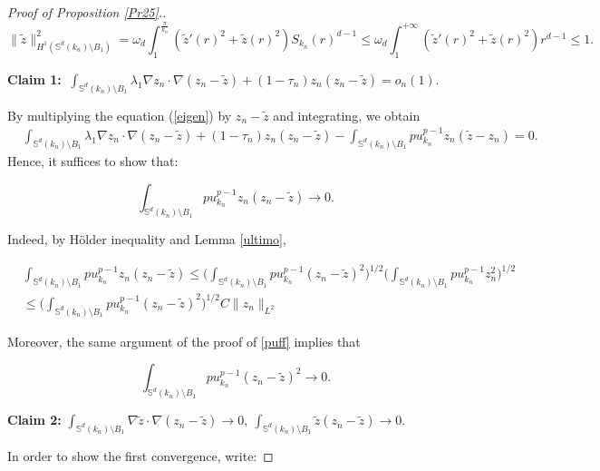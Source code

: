 \documentclass[reqno]{amsart}
\numberwithin{equation}{section}
\newenvironment{key words}{\textbf{Keywords}\mbox{  }}{ }
\begin{document}
\begin{proof}[Proof of Proposition \ref{Pr25}.]
$$\| \tilde{z}\|^2_{H^{1}(\mathbb{S}^{d}(k_{n})\setminus B_{1})} = \omega_d \int_1^{\frac{\pi}{k_n}} (\tilde{z}'(r)^2 + \tilde{z}(r)^2) S_{k_n}(r)^{d-1} \leq \omega_d \int_1^{+\infty} (\tilde{z}'(r)^2 + \tilde{z}(r)^2) r^{d-1} \leq 1.  $$

\medskip

{\bf Claim 1:}  $\ \displaystyle\int_{\mathbb{S}^{d}(k_{n})\setminus B_{1}} \lambda_{1} \nabla z_{n} \cdot \nabla (z_n - \tilde{z}) + (1-\tau_{n})z_{n}(z_n - \tilde{z}) = o_n(1).$

\medskip

By multiplying the equation (\ref{eigen}) by $z_{n}-\tilde{z}$ and integrating, we obtain
\begin{align}\label{eq040}
 &\int_{\mathbb{S}^{d}(k_{n})\setminus B_{1}} \lambda_{1} \nabla z_{n} \cdot \nabla (z_n - \tilde{z}) + (1-\tau_{n})z_{n}(z_n - \tilde{z}) -\int_{\mathbb{S}^{d}(k_{n})\setminus B_{1}} pu_{k_{n}}^{p-1} z_{n} (\tilde{z} - z_n)=0.
\end{align}
Hence, it suffices to show that:

$$ \displaystyle \int_{\mathbb{S}^{d}(k_{n})\setminus B_{1}}pu_{k_{n}}^{p-1} z_n (z_{n} - \tilde{z}) \to 0.$$
\medskip

Indeed, by H\"{o}lder inequality and Lemma \ref{ultimo},

\begin{align*} & \displaystyle \int_{\mathbb{S}^{d}(k_{n})\setminus B_{1}}pu_{k_{n}}^{p-1} z_n (z_{n} - \tilde{z})  \le \Big ( \displaystyle \int_{\mathbb{S}^{d}(k_{n})\setminus B_{1}}pu_{k_{n}}^{p-1} (z_{n} - \tilde{z})^2 \Big )^{1/2} \Big ( \displaystyle \int_{\mathbb{S}^{d}(k_{n})\setminus B_{1}}pu_{k_{n}}^{p-1} z_{n}^2 \Big )^{1/2} \\ & \le  \Big ( \displaystyle \int_{\mathbb{S}^{d}(k_{n})\setminus B_{1}}pu_{k_{n}}^{p-1} (z_{n} - \tilde{z})^2 \Big )^{1/2} C \|z_n\|_{L^2}  \end{align*}

Moreover, the same argument of the proof of \eqref{puff} implies that

$$  \displaystyle \int_{\mathbb{S}^{d}(k_{n})\setminus B_{1}}pu_{k_{n}}^{p-1} (z_{n} - \tilde{z})^2 \to 0. $$

\medskip

{\bf Claim 2: } $ \displaystyle \int_{\mathbb{S}^{d}(k_{n})\setminus B_{1}} \nabla \tilde{z} \cdot \nabla (z_{n}-\tilde{z}) \to 0, \ \int_{\mathbb{S}^{d}(k_{n})\setminus B_{1}} \tilde{z}(z_{n} - \tilde{z})\to 0.$

In order to show the first convergence, write:


\end{proof}
\end{document}
